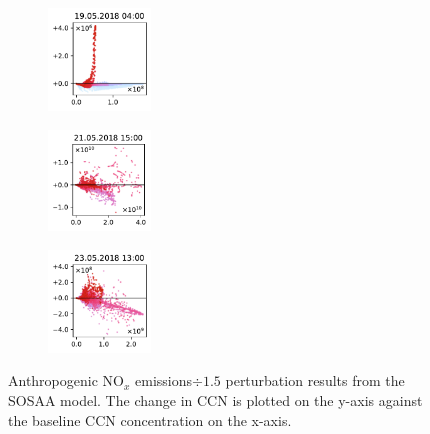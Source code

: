\begin{figure}[H]
    \begin{subfigure}
        \centering
        \includegraphics[width=0.30\textwidth,valign=t]{evaluation/figures/perturbations/perturbation-19.05.2018:04.00-nox-div-1.5.pdf}
    \end{subfigure}
    \begin{subfigure}
        \centering
        \includegraphics[width=0.30\textwidth,valign=t]{evaluation/figures/perturbations/perturbation-21.05.2018:15.00-nox-div-1.5.pdf}
    \end{subfigure}
    \begin{subfigure}
        \centering
        \includegraphics[width=0.30\textwidth,valign=t]{evaluation/figures/perturbations/perturbation-23.05.2018:13.00-nox-div-1.5.pdf}
    \end{subfigure}

    \caption[$\text{NO}_x$ emissions$\div 1.5$ perturbation SOSAA results]{Anthropogenic $\text{NO}_x$ emissions$\div 1.5$ perturbation results from the SOSAA model. The change in CCN is plotted on the y-axis against the baseline CCN concentration on the x-axis.}
    \label{fig:sosaa-perturbation-nox-div-1.5}
\end{figure}


